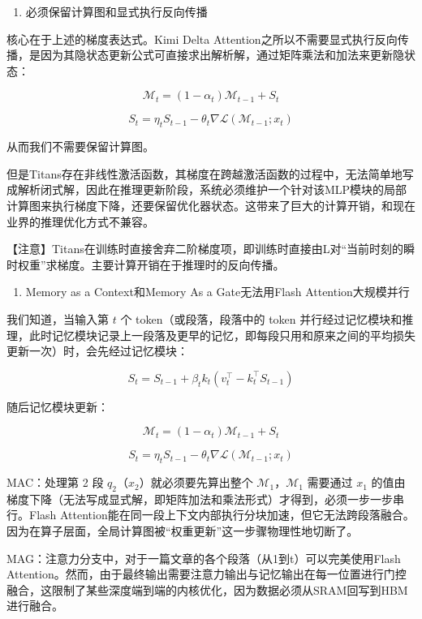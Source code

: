 \begin{enumerate}
\def\labelenumi{\arabic{enumi}.}
\tightlist
\item
  必须保留计算图和显式执行反向传播
\end{enumerate}

核心在于上述的梯度表达式。Kimi Delta Attention之所以不需要显式执行反向传播，是因为其隐状态更新公式可直接求出解析解，通过矩阵乘法和加法来更新隐状态：

\[
\mathcal{M}_t = (1 - \alpha_t)\mathcal{M}_{t-1} + S_t
\]

\[
S_t = \eta_t S_{t-1} - \theta_t \nabla \mathcal{L}(\mathcal{M}_{t-1}; x_t)
\]

从而我们不需要保留计算图。

但是Titans存在非线性激活函数，其梯度在跨越激活函数的过程中，无法简单地写成解析闭式解，因此在推理更新阶段，系统必须维护一个针对该MLP模块的局部计算图来执行梯度下降，还要保留优化器状态。这带来了巨大的计算开销，和现在业界的推理优化方式不兼容。

【注意】Titans在训练时直接舍弃二阶梯度项，即训练时直接由L对``当前时刻的瞬时权重''求梯度。主要计算开销在于推理时的反向传播。

\begin{enumerate}
\def\labelenumi{\arabic{enumi}.}
\setcounter{enumi}{1}
\tightlist
\item
  Memory as a Context和Memory As a Gate无法用Flash Attention大规模并行
\end{enumerate}

我们知道，当输入第 \(t\) 个 token（或段落，段落中的 token 并行经过记忆模块和推理，此时记忆模块记录上一段落及更早的记忆，即每段只用和原来之间的平均损失更新一次）时，会先经过记忆模块：

\[
S_t = S_{t-1} + \beta_t k_t \left(v_t^\top - k_t^\top S_{t-1}\right)
\]

随后记忆模块更新：

\[
\mathcal{M}_t = (1 - \alpha_t)\mathcal{M}_{t-1} + S_t
\]

\[
S_t = \eta_t S_{t-1} - \theta_t \nabla \mathcal{L}(\mathcal{M}_{t-1}; x_t)
\]

MAC：处理第 2 段 \(q_2\)（\(x_2\)）就必须要先算出整个 \(\mathcal{M}_1\)，\(\mathcal{M}_1\) 需要通过 \(x_1\) 的值由梯度下降（无法写成显式解，即矩阵加法和乘法形式）才得到，必须一步一步串行。Flash Attention能在同一段上下文内部执行分块加速，但它无法跨段落融合。因为在算子层面，全局计算图被``权重更新''这一步骤物理性地切断了。

MAG：注意力分支中，对于一篇文章的各个段落（从1到t）可以完美使用Flash Attention。然而，由于最终输出需要注意力输出与记忆输出在每一位置进行门控融合，这限制了某些深度端到端的内核优化，因为数据必须从SRAM回写到HBM进行融合。

